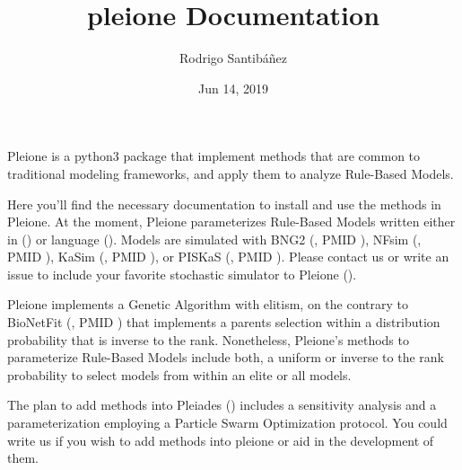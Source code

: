 \documentclass[letterpaper,10pt,english]{sphinxmanual}
\title{pleione Documentation}
\date{Jun 14, 2019}
\author{Rodrigo Santibáñez}
\begin{document}
\pagestyle{empty}
\sphinxmaketitle
\pagestyle{plain}
\sphinxtableofcontents
\pagestyle{normal}
\label{\detokenize{index::doc}}


Pleione is a python3 package that implement methods that are common to
traditional modeling frameworks, and apply them to analyze Rule-Based Models.

Here you’ll find the necessary documentation to install and use the methods in
Pleione. At the moment, Pleione parameterizes Rule-Based Models written
either in  () or  language (). Models are
simulated with BNG2 (, PMID ), NFsim (, PMID ), KaSim (, PMID ), or
PISKaS (, PMID ). Please contact us or write an issue to include your
favorite stochastic simulator to Pleione ().

Pleione implements a Genetic Algorithm with elitism, on the
contrary to BioNetFit (, PMID ) that implements a parents selection within
a distribution probability that is inverse to the rank. Nonetheless, Pleione’s
methods to parameterize Rule-Based Models include both, a uniform or inverse to the rank
probability to select models from within an elite or all models.

The plan to add methods into Pleiades () includes a sensitivity analysis and a
parameterization employing a Particle Swarm Optimization protocol. You
could write us if you wish to add methods into pleione or aid in the development
of them.
\end{document}
